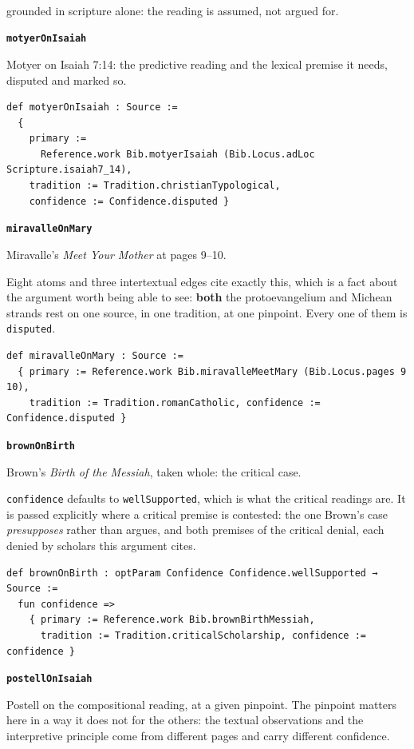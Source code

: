 \documentclass[11pt]{article}
\begin{document}
\noindent\footnotesize \textsuperscript{\dag} grounded in scripture alone: the reading is assumed, not argued for.
\normalsize

\par\medskip\noindent\textbf{\texttt{motyer\allowbreak{}On\allowbreak{}Isaiah}}\par\nobreak\noindent
Motyer on Isaiah 7:14: the predictive reading and the lexical premise it needs, disputed and marked so.

{\small\begin{verbatim}
def motyerOnIsaiah : Source :=
  {
    primary :=
      Reference.work Bib.motyerIsaiah (Bib.Locus.adLoc Scripture.isaiah7_14),
    tradition := Tradition.christianTypological,
    confidence := Confidence.disputed }
\end{verbatim}}
\par\medskip\noindent\textbf{\texttt{miravalle\allowbreak{}On\allowbreak{}Mary}}\par\nobreak\noindent
Miravalle's \emph{Meet Your Mother} at pages 9–10.

Eight atoms and three intertextual edges cite exactly this, which is a fact about the argument worth being able to see: \textbf{both} the protoevangelium and Michean strands rest on one source, in one tradition, at one pinpoint. Every one of them is \texttt{disputed}.

{\small\begin{verbatim}
def miravalleOnMary : Source :=
  { primary := Reference.work Bib.miravalleMeetMary (Bib.Locus.pages 9 10),
    tradition := Tradition.romanCatholic, confidence := Confidence.disputed }
\end{verbatim}}
\par\medskip\noindent\textbf{\texttt{brown\allowbreak{}On\allowbreak{}Birth}}\par\nobreak\noindent
Brown's \emph{Birth of the Messiah}, taken whole: the critical case.

\texttt{confidence} defaults to \texttt{well\allowbreak{}Supported}, which is what the critical readings are. It is passed explicitly where a critical premise is contested: the one Brown's case \emph{presupposes} rather than argues, and both premises of the critical denial, each denied by scholars this argument cites.

{\small\begin{verbatim}
def brownOnBirth : optParam Confidence Confidence.wellSupported → Source :=
  fun confidence =>
    { primary := Reference.work Bib.brownBirthMessiah,
      tradition := Tradition.criticalScholarship, confidence := confidence }
\end{verbatim}}
\par\medskip\noindent\textbf{\texttt{postell\allowbreak{}On\allowbreak{}Isaiah}}\par\nobreak\noindent
Postell on the compositional reading, at a given pinpoint. The pinpoint matters here in a way it does not for the others: the textual observations and the interpretive principle come from different pages and carry different confidence.
\end{document}
